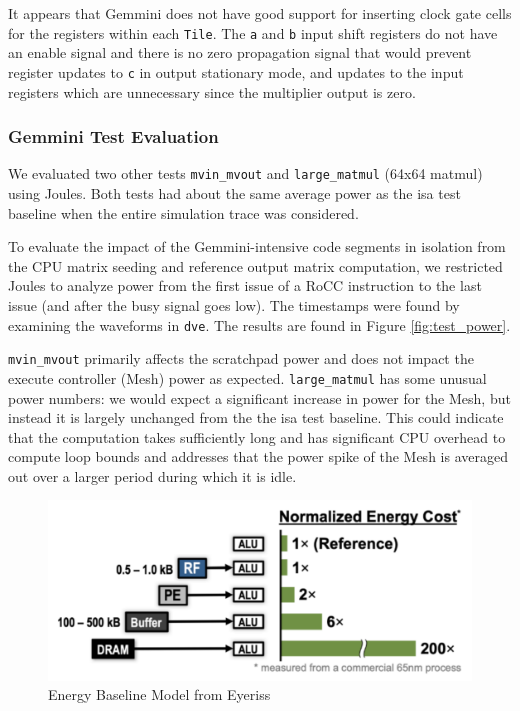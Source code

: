 \documentclass[sigconf]{acmart}
\begin{document}
It appears that Gemmini does not have good support for inserting clock gate cells for the registers within each \texttt{Tile}.
The \texttt{a} and \texttt{b} input shift registers do not have an enable signal and there is no zero propagation signal that would prevent register updates to \texttt{c} in output stationary mode, and updates to the input registers which are unnecessary since the multiplier output is zero.

\subsubsection{Gemmini Test Evaluation}
We evaluated two other tests \texttt{mvin\_mvout} and \texttt{large\_matmul} (64x64 matmul) using Joules.
Both tests had about the same average power as the isa test baseline when the entire simulation trace was considered.

To evaluate the impact of the Gemmini-intensive code segments in isolation from the CPU matrix seeding and reference output matrix computation, we restricted Joules to analyze power from the first issue of a RoCC instruction to the last issue (and after the busy signal goes low).
The timestamps were found by examining the waveforms in \texttt{dve}.
The results are found in Figure \ref{fig:test_power}.

\texttt{mvin\_mvout} primarily affects the scratchpad power and does not impact the execute controller (Mesh) power as expected.
\texttt{large\_matmul} has some unusual power numbers: we would expect a significant increase in power for the Mesh, but instead it is largely unchanged from the the isa test baseline.
This could indicate that the computation takes sufficiently long and has significant CPU overhead to compute loop bounds and addresses that the power spike of the Mesh is averaged out over a larger period during which it is idle.

\begin{figure}
  \begin{center}
    \includegraphics[width=\linewidth]{baseline_model.pdf}
  \end{center}
  \caption{Energy Baseline Model from Eyeriss\cite{eyerissv1}}
\end{figure}
\end{document}
